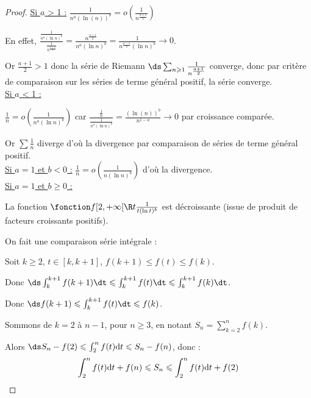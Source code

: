 \begin{proof}
    \uline{Si $a$ > 1 :}
    $\displaystyle \frac 1 {n^a(\ln(n))^b} = o \left( \frac 1 {n^{\frac{a + 1} 2}} \right)$

    En effet, $\displaystyle \frac{\frac 1 {n^a (\ln n)^b}}{\frac 1 {n^{\frac{a + 1} 2}}} = \frac{n^{\frac{a + 1} 2}}{n^a(\ln n)^b} = \frac{1}{n^{\frac{a - 1} 2}(\ln n)^b} \to 0$.

    Or $\frac{a + 1} 2 > 1$ donc la série de Riemann $\ds \sum_{n \geqslant 1} \frac 1 {n^{\frac{a + 1} 2}}$ converge, donc par critère de comparaison
    sur les séries de terme général positif, la série converge. \\ 

    \uline{Si $a$ < 1 :}

    \svspace $\displaystyle \frac 1 n = o \left( \frac{1 }{n^a (\ln n)^b} \right)$
     car $\displaystyle \frac{\frac 1 n}{\frac 1 {n^a (\ln n)^b}} = \frac{(\ln(n))^b }{n^{1 - a}} \to 0$ par croissance comparée.

     Or $\sum \frac 1 n $ diverge d'où la divergence par comparaison de séries de terme général positif. \\

    \uline{Si $a = 1$ et $b < 0$ :}
    $\frac 1 n = o \left( \frac 1 {n (\ln n)^b} \right)$ d'où la divergence. \\ 

    \uline{Si $a = 1$ et $b \geqslant 0$ :}

    \svspace La fonction $\fonction f {[2, + \infty[} \R t {\frac 1 {t (\ln t)^b}}$ est décroissante (issue de produit
    de facteurs croissants positifs). 

    On fait une comparaison série intégrale : 

    Soit $k \geqslant 2, \, t \in [k, k + 1]$, $f(k + 1) \leqslant f(t) \leqslant f(k)$.

    Donc $\ds \int_{k}^{k + 1} f(k + 1) \dt \leqslant \int_{k}^{k + 1} f(t) \dt \leqslant \int_{k}^{k + 1} f(k) \dt$.

    Donc $\ds f(k + 1) \leqslant \int_{k}^{k + 1} f(t) \dt \leqslant f(k)$.

    Sommons de $k = 2$ à $n - 1$, pour $n \geqslant 3$, en notant $\displaystyle S_n = \sum_{k = 2}^{n} f(k)$. 

    Alors $\ds S_n - f(2) \leqslant \int_{2}^{n} f(t) \text d t \leqslant S_n - f(n)$, donc :
    \[\int_{2}^{n} f(t) \text d t + f(n) \leqslant S_n \leqslant \int_{2}^{n} f(t) \text d t + f(2)\]


\end{proof}
